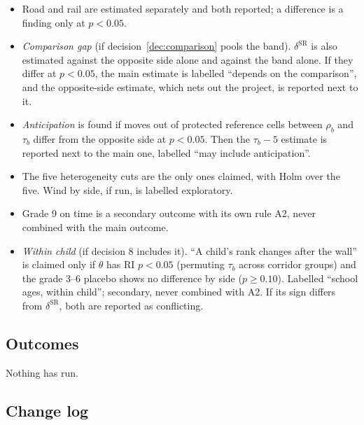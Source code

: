 \documentclass[11pt]{article}
\newcommand{\prule}[1]{\item[\(\Diamond\) #1]}
\begin{document}
\begin{itemize}[leftmargin=4.2em]
\prule{B2} Road and rail are estimated separately and both reported; a difference is a finding
  only at \(p < 0.05\).
\prule{B3} \emph{Comparison gap} (if decision~\ref{dec:comparison} pools the band).
  \(\delta^{\text{SR}}\) is also estimated against the opposite side alone and against the band
  alone. If they differ at \(p < 0.05\), the main estimate is labelled ``depends on the
  comparison'', and the opposite-side estimate, which nets out the project, is reported next to
  it.
\prule{C1} \emph{Anticipation} is found if moves out of protected reference cells between
  \(\rho_b\) and \(\tau_b\) differ from the opposite side at \(p < 0.05\). Then the
  \(\tau_b - 5\) estimate is reported next to the main one, labelled ``may include
  anticipation''.
\prule{D1} The five heterogeneity cuts are the only ones claimed, with Holm over the five. Wind
  by side, if run, is labelled exploratory.
\prule{E1} Grade 9 on time is a secondary outcome with its own rule A2, never combined with the
  main outcome.
\prule{F1} \emph{Within child} (if decision 8 includes it). ``A child's rank changes after the
  wall'' is claimed only if \(\theta\) has RI \(p < 0.05\) (permuting \(\tau_b\) across corridor
  groups) and the grade 3--6 placebo shows no difference by side (\(p \ge 0.10\)). Labelled
  ``school ages, within child''; secondary, never combined with A2. If its sign differs from
  \(\delta^{\text{SR}}\), both are reported as conflicting.
\end{itemize}

\subsection{Outcomes}\label{sec:outcomes}

Nothing has run.

\subsection{Change log}\label{sec:changelog}
\end{document}
